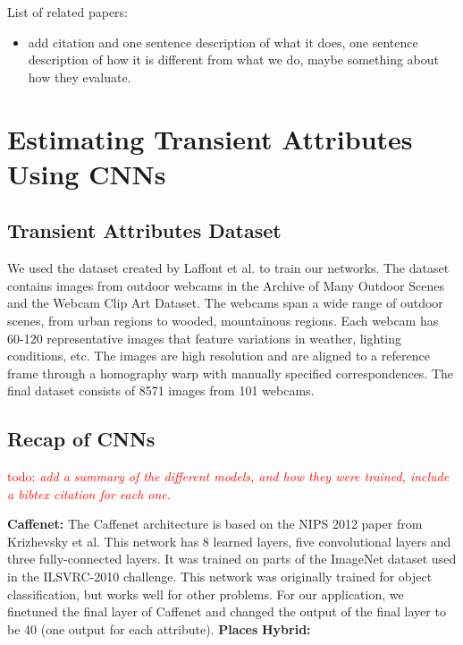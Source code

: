 \documentclass{article}
\newcommand{\todo}[1]{\textcolor{red}{todo: {\em #1}}}
\begin{document}
List of related papers:
\begin{itemize}

  \item add citation and one sentence description of what it does, one
    sentence description of how it is different from what we do, maybe
    something about how they evaluate.

\end{itemize}

\section{Estimating Transient Attributes Using CNNs}

\subsection{Transient Attributes Dataset}
We used the dataset created by Laffont\cite{Laffont14} et al. to train our 
networks. The dataset contains images from outdoor webcams in the  
Archive of Many Outdoor Scenes\cite{jacobs07amos} and the Webcam Clip Art 
Dataset\cite{lalondesig09}.  The webcams span a wide range of outdoor scenes,
from urban regions to wooded, mountainous regions. Each webcam has 60-120 
representative images that feature variations in weather, lighting conditions, 
etc.  The images are high resolution and are aligned to a reference frame 
through a homography warp with manually specified correspondences.  The final
dataset consists of 8571 images from 101 webcams.


\subsection{Recap of CNNs}

\todo{add a summary of the different models, and how they were
trained, include a bibtex citation for each one.}

\textbf{Caffenet:} The Caffenet architecture is based on the NIPS 2012 paper
from Krizhevsky\cite{caffenetnips12} et al.  This network has 8 learned layers, 
five convolutional layers and three fully-connected layers.  It was trained on 
parts of the ImageNet dataset used in the ILSVRC-2010\cite{ILSVRCarxiv14} 
challenge.  This network was originally trained for object classification, but
works well for other problems. For our application, we finetuned the final layer 
of Caffenet and changed the output of the final layer to be 40 (one output for 
each attribute).
\newline\indent
\textbf{Places} \cite{zhou2014places}
\newline\indent
\textbf{Hybrid:} \cite{zhou2014places}
\end{document}
